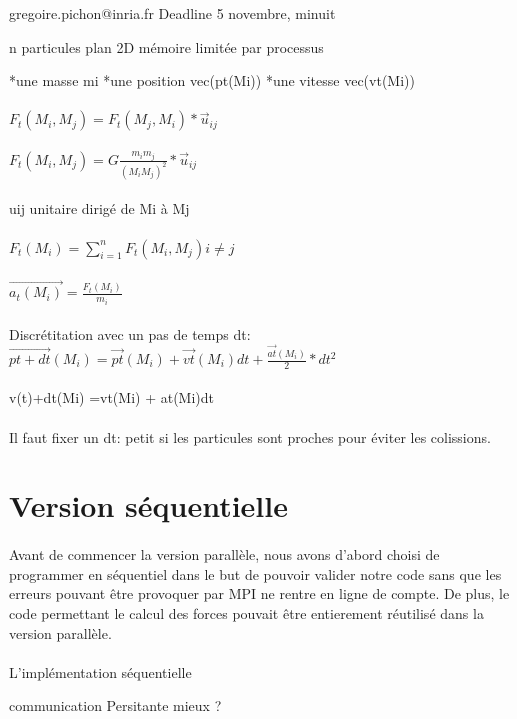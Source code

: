 \documentclass{article}
\begin{document}
gregoire.pichon@inria.fr
Deadline 5 novembre, minuit

n particules plan 2D
mémoire limitée par processus

*une masse mi
*une position vec(pt(Mi)) 
*une vitesse vec(vt(Mi))

\paragraph{}
$ F_t(M_i, M_j) = F_t(M_j, M_i) * \overrightarrow{u}_{ij} $
\paragraph{}
$ F_t(M_i, M_j) = G \frac{m_i m_j}{(M_i M_j)^2} * \overrightarrow{u}_{ij} $
\paragraph{}
uij unitaire dirigé de Mi à Mj
\paragraph{}
$ F_t(M_i) = \sum_{i=1}^{n}  F_t(M_i, M_j) i \not= j $
\paragraph{}
$ \overrightarrow{a_t(M_i)} = \frac{F_t(M_i)}{m_i} $
\paragraph{}
Discrétitation avec un pas de temps dt: 
$ \overrightarrow{pt+dt}(M_i) = \overrightarrow{pt}(M_i) + \overrightarrow{vt}(M_i)dt + \frac{\overrightarrow{at}(M_i)}{2} * dt^2 $
\paragraph{}
v(t)+dt(Mi)  =vt(Mi) + at(Mi)dt
\paragraph{}
Il faut fixer un dt: petit si les particules sont proches pour éviter les colissions.


\section{Version séquentielle}
\paragraph{}Avant de commencer la version parallèle, nous avons d'abord choisi de programmer en séquentiel dans le but de pouvoir valider notre code sans que les erreurs pouvant être provoquer par MPI ne rentre en ligne de compte. De plus, le code permettant le calcul des forces pouvait être entierement réutilisé dans la version parallèle.

\paragraph{}L'implémentation séquentielle




communication Persitante mieux ?
\end{document}
